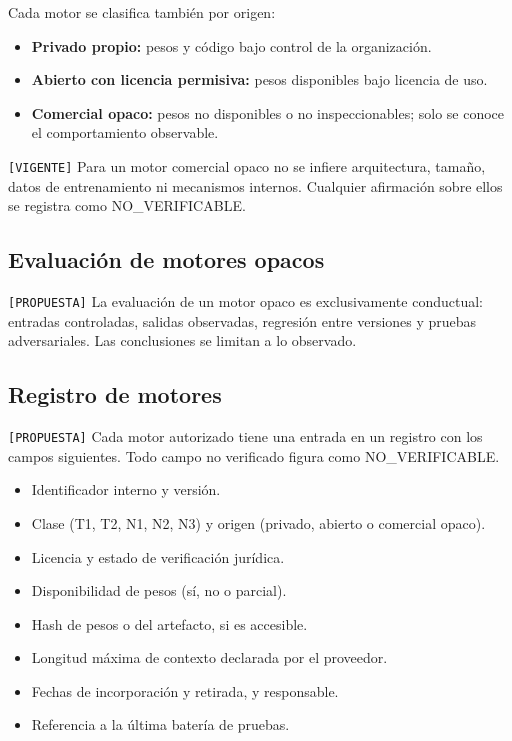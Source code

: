 \documentclass[12pt]{article}
\begin{document}
Cada motor se clasifica también por origen:

\begin{itemize}
    \item \textbf{Privado propio:} pesos y código bajo control de la organización.
    \item \textbf{Abierto con licencia permisiva:} pesos disponibles bajo licencia de uso.
    \item \textbf{Comercial opaco:} pesos no disponibles o no inspeccionables; solo se conoce el comportamiento observable.
\end{itemize}

\texttt{[VIGENTE]} Para un motor comercial opaco no se infiere arquitectura,
tamaño, datos de entrenamiento ni mecanismos internos. Cualquier afirmación
sobre ellos se registra como NO\_VERIFICABLE.

\subsection{Evaluación de motores opacos}

\texttt{[PROPUESTA]} La evaluación de un motor opaco es exclusivamente
conductual: entradas controladas, salidas observadas, regresión entre
versiones y pruebas adversariales. Las conclusiones se limitan a lo observado.

\subsection{Registro de motores}

\texttt{[PROPUESTA]} Cada motor autorizado tiene una entrada en un registro
con los campos siguientes. Todo campo no verificado figura como NO\_VERIFICABLE.

\begin{itemize}
    \item Identificador interno y versión.
    \item Clase (T1, T2, N1, N2, N3) y origen (privado, abierto o comercial opaco).
    \item Licencia y estado de verificación jurídica.
    \item Disponibilidad de pesos (sí, no o parcial).
    \item Hash de pesos o del artefacto, si es accesible.
    \item Longitud máxima de contexto declarada por el proveedor.
    \item Fechas de incorporación y retirada, y responsable.
    \item Referencia a la última batería de pruebas.
\end{itemize}
\end{document}
